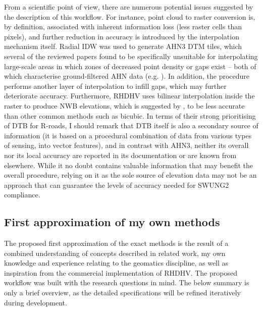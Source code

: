 From a scientific point of view, there are numerous potential issues suggested by the description of this workflow. For instance, point cloud to raster conversion is, by definition, associated with inherent information loss (less raster cells than pixels), and further reduction in accuracy is introduced by the interpolation mechanism itself. Radial IDW was used to generate AHN3 DTM tiles, which several of the reviewed papers found to be specifically unsuitable for interpolating large-scale areas in which zones of decreased point density or gaps exist – both of which characterise ground-filtered AHN data (e.g. \cite{guo_etal_2010}). In addition, the procedure performs another layer of interpolation to infill gaps, which may further deteriorate accuracy. Furthermore, RHDHV uses bilinear interpolation inside the raster to produce NWB elevations, which is suggested by \cite{shi_etal_2005}, to be less accurate than other common methods such as bicubic. In terms of their strong prioritising of DTB for R-roads, I should remark that DTB itself is also a secondary source of information (it is based on a procedural combination of data from various types of sensing, into vector features), and in contrast with AHN3, neither its overall nor its local accuracy are reported in its documentation or are known from elsewhere. While it no doubt contains valuable information that may benefit the overall procedure, relying on it as the sole source of elevation data may not be an approach that can guarantee the levels of accuracy needed for SWUNG2 compliance.

\subsection{First approximation of my own methods}
\label{sub:mymethods}

The proposed first approximation of the exact methods is the result of a combined understanding of concepts described in related work, my own knowledge and experience relating to the geomatics discipline, as well as inspiration from the commercial implementation of RHDHV. The proposed workflow was built with the research questions in mind. The below summary is only a brief overview, as the detailed specifications will be refined iteratively during development.

